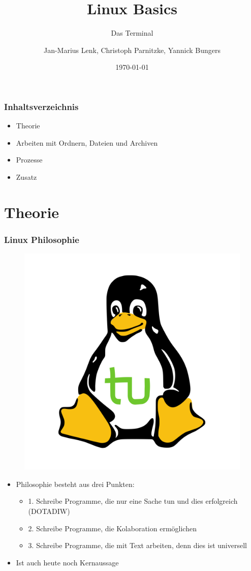 \documentclass[12pt,utf8]{beamer}
\title{Linux Basics}
\subtitle{Das Terminal}
\author[J.-M. Lenk, C. Parnitzke, Y. Bungers]{Jan-Marius Lenk, Christoph Parnitzke, Yannick Bungers}
\institute[FOSS AG]{Free and Open Source Software AG\\ Fakultät für Informatik}
\date{\today}
\begin{document}
\titlepage

\begin{frame}
\frametitle{Inhaltsverzeichnis}
\begin{itemize}
	\item Theorie
	\item Arbeiten mit Ordnern, Dateien und Archiven
	\item Prozesse
	\item Zusatz
\end{itemize}
\end{frame}

\section{Theorie}
\begin{frame}
\frametitle{Linux Philosophie}
\begin{figure}
\includegraphics[scale=0.15]{res/tuX_tu.png}
\end{figure}
\begin{itemize}
	\item Philosophie besteht aus drei Punkten:
	\begin{itemize}
		\item 1. Schreibe Programme, die nur eine Sache tun und dies erfolgreich (DOTADIW)
		\item 2. Schreibe Programme, die Kolaboration ermöglichen
		\item 3. Schreibe Programme, die mit Text arbeiten, denn dies ist universell
	\end{itemize}
	\item Ist auch heute noch Kernaussage
\end{itemize}
\end{frame}
\end{document}
